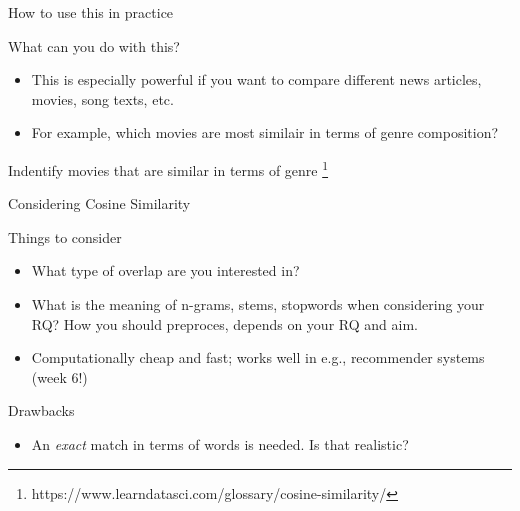 \documentclass[handout]{beamer}
\begin{document}
\begin{frame}{How to use this in practice}
	\begin{block}{What can you do with this?}
		\begin{itemize}[<+>]
			\item This is especially powerful if you want to compare different news articles, movies, song texts, etc.
			\item For example, which movies are most similair in terms of genre composition?
			\end{itemize}
	\end{block}
\end{frame}

\begin{frame}
Indentify movies that are similar in terms of genre  \footnote{https://www.learndatasci.com/glossary/cosine-similarity/}
\end{frame}

\begin{frame}{Considering Cosine Similarity}
	\begin{block}{Things to consider}
		\begin{itemize}
		\item <1-> What type of overlap are you interested in?
		\item <2->What is the meaning of n-grams, stems,  stopwords when considering your RQ? How you should preproces, depends on your RQ and aim. 
		\item <3-> Computationally cheap and fast; works well in e.g., recommender systems (week 6!)
		\end{itemize}
	\end{block}
\begin{alertblock}{Drawbacks}
	\begin{itemize}
	\item <4-> An \emph{exact} match in terms of words is needed. Is that realistic?	
	\end{itemize}
\end{alertblock}
\end{frame}
\end{document}
